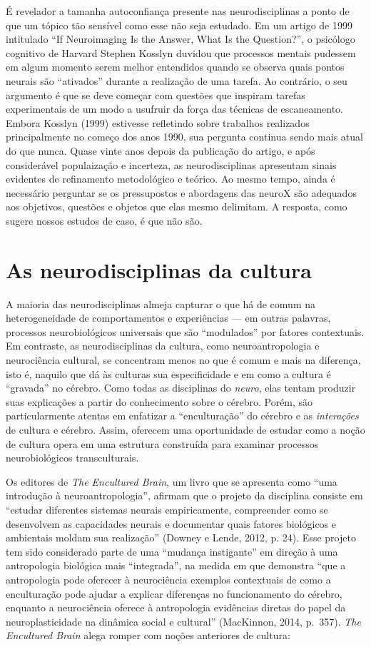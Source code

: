 É revelador a tamanha autoconfiança presente nas neurodisciplinas a
ponto de que um tópico tão sensível como esse não seja estudado. Em um
artigo de 1999 intitulado ``If Neuroimaging Is the Answer, What Is the
Question?'', o psicólogo cognitivo de Harvard Stephen Kosslyn duvidou
que processos mentais pudessem em algum momento serem melhor entendidos
quando se observa quais pontos neurais são ``ativados'' durante a
realização de uma tarefa. Ao contrário, o seu argumento é que se deve
começar com questões que inspiram tarefas experimentais de um modo a
usufruir da força das técnicas de escaneamento. Embora Kosslyn (1999)
estivesse refletindo sobre trabalhos realizados principalmente no começo
dos anos 1990, sua pergunta continua sendo mais atual do que nunca.
Quase vinte anos depois da publicação do artigo, e após considerável
populaização e incerteza, as neurodisciplinas apresentam sinais
evidentes de refinamento metodológico e teórico. Ao mesmo tempo, ainda é
necessário perguntar se os pressupostos e abordagens das neuroX são
adequados aos objetivos, questões e objetos que elas mesmo delimitam. A
resposta, como sugere nossos estudos de caso, é que não são.

\chapter{As neurodisciplinas da cultura}

A maioria das neurodisciplinas almeja capturar o que há de comum na
heterogeneidade de comportamentos e experiências --- em outras palavras,
processos neurobiológicos universais que são ``modulados'' por fatores
contextuais. Em contraste, as neurodisciplinas da cultura, como
neuroantropologia e neurociência cultural, se concentram menos no que é
comum e mais na diferença, isto é, naquilo que dá às culturas sua
especificidade e em como a cultura é ``gravada'' no cérebro. Como todas
as disciplinas do \emph{neuro}, elas tentam produzir suas explicações a
partir do conhecimento sobre o cérebro. Porém, são particularmente
atentas em enfatizar a ``enculturação'' do cérebro e as
\emph{interações} de cultura e cérebro. Assim, oferecem uma oportunidade
de estudar como a noção de cultura opera em uma estrutura construída
para examinar processos neurobiológicos transculturais.

Os editores de \emph{The Encultured Brain}, um livro que se apresenta
como ``uma introdução à neuroantropologia'', afirmam que o projeto da
disciplina consiste em ``estudar diferentes sistemas neurais
empiricamente, compreender como se desenvolvem as capacidades neurais e
documentar quais fatores biológicos e ambientais moldam sua realização''
(Downey e Lende, 2012, p. 24). Esse projeto tem sido considerado parte
de uma ``mudança instigante'' em direção à uma antropologia biológica
mais ``integrada'', na medida em que demonstra ``que a antropologia pode
oferecer à neurociência exemplos contextuais de como a enculturação pode
ajudar a explicar diferenças no funcionamento do cérebro, enquanto a
neurociência oferece à antropologia evidências diretas do papel da
neuroplasticidade na dinâmica social e cultural'' (MacKinnon, 2014,
p.~357). \emph{The Encultured Brain} alega romper com noções anteriores
de cultura:

